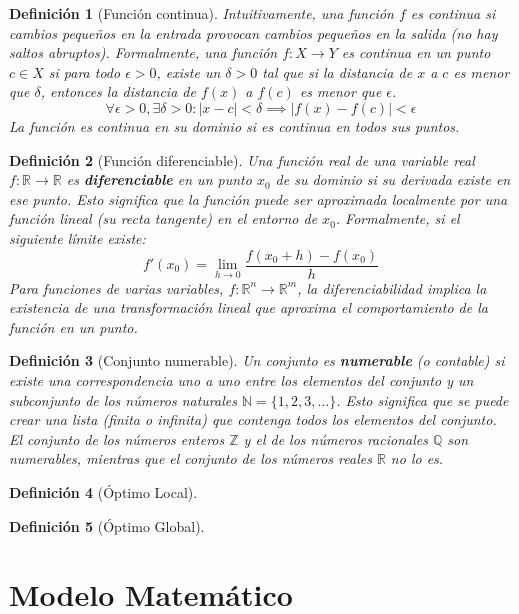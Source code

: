 \documentclass[12pt,a4paper]{book}
\newtheorem{defi}{Definición}[section]
\begin{document}
\begin{defi}[Función continua]
Intuitivamente, una función $f$ es continua si cambios pequeños en la entrada provocan cambios pequeños en la salida (no hay saltos abruptos). Formalmente, una función $f: X \to Y$ es continua en un punto $c \in X$ si para todo $\epsilon > 0$, existe un $\delta > 0$ tal que si la distancia de $x$ a $c$ es menor que $\delta$, entonces la distancia de $f(x)$ a $f(c)$ es menor que $\epsilon$.
$$ \forall \epsilon > 0, \exists \delta > 0 : |x-c| < \delta \implies |f(x)-f(c)| < \epsilon $$
La función es continua en su dominio si es continua en todos sus puntos.
\end{defi}

\begin{defi}[Función diferenciable]
Una función real de una variable real $f: \mathbb{R} \to \mathbb{R}$ es \textbf{diferenciable} en un punto $x_0$ de su dominio si su derivada existe en ese punto. Esto significa que la función puede ser aproximada localmente por una función lineal (su recta tangente) en el entorno de $x_0$. Formalmente, si el siguiente límite existe:
$$ f'(x_0) = \lim_{h \to 0} \frac{f(x_0+h) - f(x_0)}{h} $$
Para funciones de varias variables, $f: \mathbb{R}^n \to \mathbb{R}^m$, la diferenciabilidad implica la existencia de una transformación lineal  que aproxima el comportamiento de la función en un punto.
\end{defi}

\begin{defi}[Conjunto numerable]
Un conjunto es \textbf{numerable} (o contable) si existe una correspondencia uno a uno entre los elementos del conjunto y un subconjunto de los números naturales $\mathbb{N} = \{1, 2, 3, \dots\}$. Esto significa que se puede crear una lista (finita o infinita) que contenga todos los elementos del conjunto. El conjunto de los números enteros $\mathbb{Z}$ y el de los números racionales $\mathbb{Q}$ son numerables, mientras que el conjunto de los números reales $\mathbb{R}$ no lo es.
\end{defi}

\begin{defi}[Óptimo Local]

\end{defi}

\begin{defi}[Óptimo Global]

\end{defi}

\section{Modelo Matemático}
\end{document}
